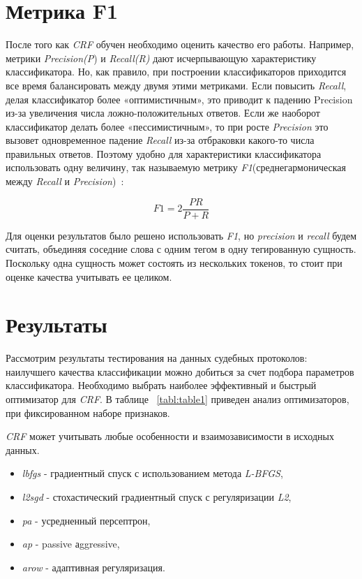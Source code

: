 \documentclass{csmathnotes}
\begin{document}
\section*{Метрика F1}
После того как \emph{CRF} обучен необходимо оценить качество его работы. Например, метрики \emph{Precision(P}) и \emph{Recall(R)} дают исчерпывающую характеристику классификатора. Но, как правило, при построении классификаторов приходится все время балансировать между двумя этими метриками. Если повысить \emph{Recall}, делая классификатор более «оптимистичным», это приводит к падению Precision из-за увеличения числа ложно-положительных ответов. Если же наоборот классификатор делать более «пессимистичным», то при росте \emph{Precision} это вызовет одновременное падение \emph{Recall} из-за отбраковки какого-то числа правильных ответов. Поэтому удобно для характеристики классификатора использовать одну величину, так называемую метрику \emph{F1}(среднегармоническая между \emph{Recall} и \emph{Precision})~\cite{F1}:

\begin{equation}
F1 = 2\frac{P R}{P + R} 
\end{equation}

Для оценки результатов было решено использовать \emph{F1}, но \emph{precision} и \emph{recall} будем считать, объединяя соседние слова с одним тегом в одну тегированную сущность. Поскольку одна сущность может состоять из нескольких токенов, то стоит при оценке качества учитывать ее целиком. 

\section*{Результаты}
Рассмотрим результаты тестирования на данных судебных протоколов: наилучшего качества классификации можно добиться за счет подбора параметров классификатора. Необходимо выбрать наиболее эффективный и быстрый оптимизатор для \emph{CRF}. В таблице ~\ref{tabl:table1} приведен анализ оптимизаторов, при фиксированном наборе признаков.


\emph{CRF} может учитывать любые особенности и взаимозависимости в исходных данных.
\begin{itemize}
	\item \emph{lbfgs} - градиентный спуск с использованием метода 
	\emph{L-BFGS},
	\item \emph{l2sgd} - стохастический  градиентный спуск с регуляризации \emph{L2},
	\item \emph{pa} - усредненный персептрон,
	\item \emph{ap} - passive аggressive,
	\item \emph{arow} - адаптивная регуляризация.
\end{itemize}
\end{document}
